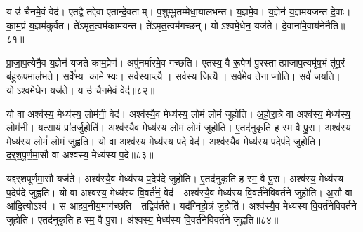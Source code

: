 य उ॑ चैनमे॒वं वेद॑।
ए॒तद्वै तद्दे॒वा ए॒तान्दे॒वताम्।
प॒शुम्भू॒तम्मेधा॒याल॑भन्त।
य॒ज्ञमे॒व।
य॒ज्ञेन॑ य॒ज्ञम॑यजन्त दे॒वाः।
का॒म॒प्रं य॒ज्ञम॑कुर्वत।
ते॑ऽमृत॒त्वम॑कामयन्त।
ते॑ऽमृत॒त्वम॑गच्छन्।
योऽश्वमे॒धेन॒ यज॑ते।
दे॒वाना॑मे॒वाय॑नेनैति॥८१॥

प्रा॒जा॒प॒त्येनै॒व य॒ज्ञेन॑ यजते काम॒प्रेण॑।
अपु॑नर्मारमे॒व ग॑च्छति।
ए॒तस्य॒ वै रू॒पेण॑ पु॒रस्तात्प्राजाप॒त्यमृ॑ष॒भं तू॑प॒रं ब॑हुरू॒पमाल॑भते।
सर्वे॑भ्य॒ कामेभ्यः।
सर्व॒स्याप्त्यै।
सर्व॑स्य॒ जित्यै।
सर्व॑मे॒व तेनाप्नोति।
सर्वं॑ जयति।
योऽश्वमे॒धेन॒ यज॑ते।
य उ॑ चैनमे॒वं वेद॑॥८२॥\anuvakamend[मेधोऽभ॑व॒द्यज॑त एति॒ वेद॑]

यो वा अश्व॑स्य॒ मेध्य॑स्य॒ लोम॑नी॒ वेद॑।
अश्व॑स्यै॒व मेध्य॑स्य॒ लोमं॑ लोमं जुहोति।
अ॒हो॒रा॒त्रे वा अश्व॑स्य॒ मेध्य॑स्य॒ लोम॑नी।
यत्सा॒यं प्रा॑तर्जु॒होति॑।
अश्व॑स्यै॒व मेध्य॑स्य॒ लोमं॑ लोमं जुहोति।
ए॒तद॑नुकृति ह स्म॒ वै पु॒रा।
अश्व॑स्य॒ मेध्य॑स्य॒ लोमं॑ लोमं जुह्वति।
यो वा अश्व॑स्य॒ मेध्य॑स्य प॒दे वेद॑।
अश्व॑स्यै॒व मेध्य॑स्य प॒देप॑दे जुहोति।
द॒र्॒श॒पू॒र्ण॒मा॒सौ वा अश्व॑स्य॒ मेध्य॑स्य प॒दे॥८३॥

यद्द॑र्‌शपूर्णमा॒सौ यज॑ते।
अश्व॑स्यै॒व मेध्य॑स्य प॒देप॑दे जुहोति।
ए॒तद॑नुकृति ह स्म॒ वै पु॒रा।
अश्व॑स्य॒ मेध्य॑स्य प॒देप॑दे जुह्वति।
यो वा अश्व॑स्य॒ मेध्य॑स्य वि॒वर्त॑नं॒ वेद॑।
अश्व॑स्यै॒व मेध्य॑स्य वि॒वर्त॑नेविवर्तने जुहोति।
अ॒सौ वा आ॑दि॒त्योऽश्व॑।
स आ॑हव॒नीय॒माग॑च्छति।
तद्विव॑र्तते।
यद॑ग्निहो॒त्रं जु॒होति॑।
अश्व॑स्यै॒व मेध्य॑स्य वि॒वर्त॑नेविवर्तने जुहोति।
ए॒तद॑नुकृति ह स्म॒ वै पु॒रा।
अ॑श्वस्य॒ मेध्य॑स्य वि॒वर्त॑नेविवर्तने जुह्वति॥८४॥\anuvakamend[प॒दे अ॑ग्निहो॒त्रं जु॒होति॒ त्रीणि॑ च]

\clearpage
